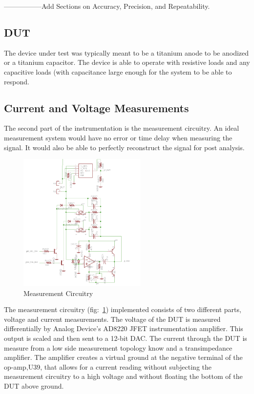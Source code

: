 \documentclass[journal]{IEEEtran}
\begin{document}
-----------------Add Sections on Accuracy, Precision, and Repeatability. 

\subsection{DUT}

The device under test was typically meant to be a titanium anode to be anodized or a titanium capacitor. The device is able to operate with resistive loads and any capacitive loads (with capacitance large enough for the system to be able to respond.


\subsection{Current and Voltage Measurements}

The second part of the instrumentation is the measurement circuitry. An ideal measurement system would have no error or time delay when measuring the signal. It would also be able to perfectly reconstruct the signal for post analysis. 
 

\begin{figure}[here]
\centering
\includegraphics[width=2.5in]{measCir}
\caption{Measurement Circuitry}
\label{fig:measCir}
\end{figure}

The measurement circuitry (fig:~\ref{fig:measCir}) implemented consists of two different parts, voltage and current measurements. The voltage of the DUT is measured differentially by Analog Device’s AD8220 JFET instrumentation amplifier. This output is scaled and then sent to a 12-bit DAC. The current through the DUT is measure from a low side measurement topology know and a transimpedance amplifier. The amplifier creates a virtual ground at the negative terminal of the op-amp,U39, that allows for a current reading without subjecting the measurement circuitry to a high voltage and without floating the bottom of the DUT above ground.
\end{document}
